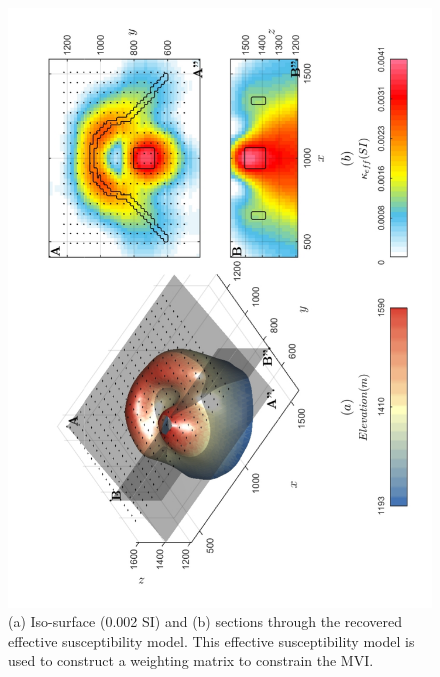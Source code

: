 \begin{figure}[h!]
\centering
\includegraphics[scale=0.52, angle =270]{3D_Inv_l2l2_model_kEff.pdf}
\caption{ (a) Iso-surface (0.002 SI) and (b) sections through the recovered effective susceptibility model. This effective susceptibility model is used to construct a weighting matrix to constrain the MVI.}
\label{fig:3D_Inv_l2l2_CMI_kEff}
\end{figure}
